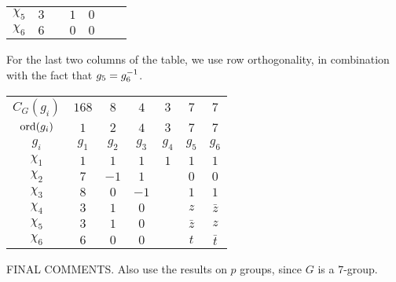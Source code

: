 \begin{boxexample}[Constructing the Character Table of $G = \PSL{2, 7}$]
\begin{table}[H]
\begin{subtable}{0.45\linewidth}
\begin{tabular}{|c|cccccc|}
                $\chi_5$ & $3$ & & $1$ & $0$ & & \\
                $\chi_6$ & $6$ & & $0$ & $0$ & & \\
            \end{tabular}
        \end{subtable}
    \end{table}
    For the last two columns of the table, we use row orthogonality, in combination with the fact that $g_5 = g_6^{-1}$.
    \begin{table}[H]
        \centering
        \begin{tabular}{|c|cccccc|}
            $C_G(g_i)$ & $168$ & $8$ & $4$ & $3$ & $7$ & $7$ \\
            $\operatorname{ord}\!\left( g_i \right)$ & $1$ & $2$ & $4$ & $3$ & $7$ & $7$ \\
            $g_i$ & $g_1$ & $g_2$ & $g_3$ & $g_4$ & $g_5$ & $g_6$ \\
            \hline
            $\chi_1$ & $1$ & $1$ & $1$ & $1$ & $1$ & $1$ \\
            $\chi_2$ & $7$ & $-1$ & $1$ & & $0$ & $0$ \\
            $\chi_3$ & $8$ & $0$ & $-1$ & & $1$ & $1$ \\
            $\chi_4$ & $3$ & $1$ & $0$ & & $z$ & $\bar{z}$ \\
            $\chi_5$ & $3$ & $1$ & $0$ & & $\bar{z}$ & $z$ \\
            $\chi_6$ & $6$ & $0$ & $0$ & & $t$ & $\bar{t}$ \\
        \end{tabular}
    \end{table}

    FINAL COMMENTS. Also use the results on $p$ groups, since $G$ is a $7$-group.
\end{boxexample}